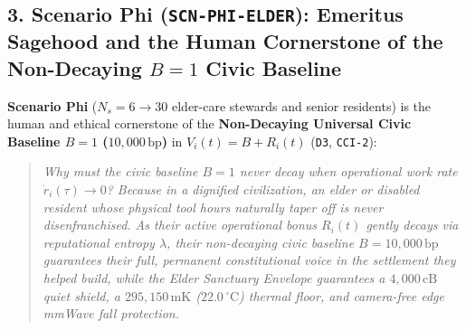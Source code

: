 \subsection{3. Scenario Phi (\texttt{SCN-PHI-ELDER}): Emeritus Sagehood and the Human Cornerstone of the Non-Decaying $B = 1$ Civic Baseline}
\textbf{Scenario Phi} ($N_s = 6 \to 30$ elder-care stewards and senior residents) is the human and ethical cornerstone of the \textbf{Non-Decaying Universal Civic Baseline $B = 1$ ($10{,}000\,\mathrm{bp}$)} in $V_i(t) = B + R_i(t)$ (\texttt{D3}, \texttt{CCI-2}):
\begin{quote}
\textit{Why must the civic baseline $B = 1$ never decay when operational work rate $\dot{r}_i(\tau) \to 0$? Because in a dignified civilization, an elder or disabled resident whose physical tool hours naturally taper off is never disenfranchised. As their active operational bonus $R_i(t)$ gently decays via reputational entropy $\lambda$, their non-decaying civic baseline $B = 10{,}000\,\mathrm{bp}$ guarantees their full, permanent constitutional voice in the settlement they helped build, while the Elder Sanctuary Envelope guarantees a $4{,}000\,\mathrm{cB}$ quiet shield, a $295{,}150\,\mathrm{mK}$ ($22.0\,^\circ\mathrm{C}$) thermal floor, and camera-free edge mmWave fall protection.}
\end{quote}

